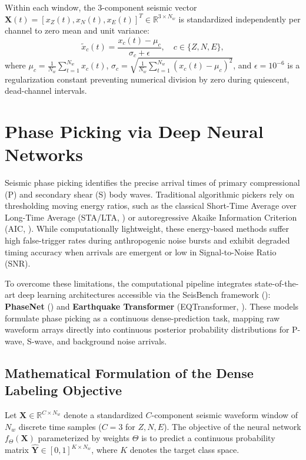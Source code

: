 Within each window, the 3-component seismic vector $\mathbf{X}(t) = [x_Z(t), x_N(t), x_E(t)]^T \in \mathbb{R}^{3 \times N_w}$ is standardized independently per channel to zero mean and unit variance:
\begin{equation}
  \tilde{x}_c(t) = \frac{x_c(t) - \mu_c}{\sigma_c + \epsilon}, \quad c \in \{Z, N, E\},
\end{equation}
where $\mu_c = \frac{1}{N_w}\sum_{t=1}^{N_w} x_c(t)$, $\sigma_c = \sqrt{\frac{1}{N_w}\sum_{t=1}^{N_w} (x_c(t) - \mu_c)^2}$, and $\epsilon = 10^{-6}$ is a regularization constant preventing numerical division by zero during quiescent, dead-channel intervals.

\section{Phase Picking via Deep Neural Networks}
\label{sec:phase_picking}

Seismic phase picking identifies the precise arrival times of primary compressional (P) and secondary shear (S) body waves. Traditional algorithmic pickers rely on thresholding moving energy ratios, such as the classical Short-Time Average over Long-Time Average (\ac{STA/LTA}, \cite{STALTA}) or autoregressive Akaike Information Criterion (\ac{AIC}, \cite{LEONARD1999247}). While computationally lightweight, these energy-based methods suffer high false-trigger rates during anthropogenic noise bursts and exhibit degraded timing accuracy when arrivals are emergent or low in Signal-to-Noise Ratio (\ac{SNR}).

To overcome these limitations, the computational pipeline integrates state-of-the-art deep learning architectures accessible via the SeisBench framework (\cite{SeisBench}): \textbf{PhaseNet} (\cite{PhaseNet}) and \textbf{Earthquake Transformer} (\ac{EQTransformer}, \cite{EQTransformer}). These models formulate phase picking as a continuous dense-prediction task, mapping raw waveform arrays directly into continuous posterior probability distributions for P-wave, S-wave, and background noise arrivals.

\subsection{Mathematical Formulation of the Dense Labeling Objective}
Let $\mathbf{X} \in \mathbb{R}^{C \times N_w}$ denote a standardized $C$-component seismic waveform window of $N_w$ discrete time samples ($C=3$ for $Z, N, E$). The objective of the neural network $f_\Theta(\mathbf{X})$ parameterized by weights $\Theta$ is to predict a continuous probability matrix $\hat{\mathbf{Y}} \in [0, 1]^{K \times N_w}$, where $K$ denotes the target class space.

